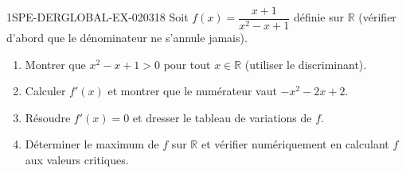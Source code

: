 \begin{exercice}{1SPE-DERGLOBAL-EX-020}{3}{18}
Soit $f(x) = \dfrac{x+1}{x^2-x+1}$ définie sur $\mathbb{R}$ (vérifier d'abord que le dénominateur ne s'annule jamais).

\begin{enumerate}
  \item Montrer que $x^2-x+1 > 0$ pour tout $x \in \mathbb{R}$ (utiliser le discriminant).
  \item Calculer $f'(x)$ et montrer que le numérateur vaut $-x^2-2x+2$.
  \item Résoudre $f'(x) = 0$ et dresser le tableau de variations de $f$.
  \item Déterminer le maximum de $f$ sur $\mathbb{R}$ et vérifier numériquement en calculant $f$ aux valeurs critiques.
\end{enumerate}
\end{exercice}
